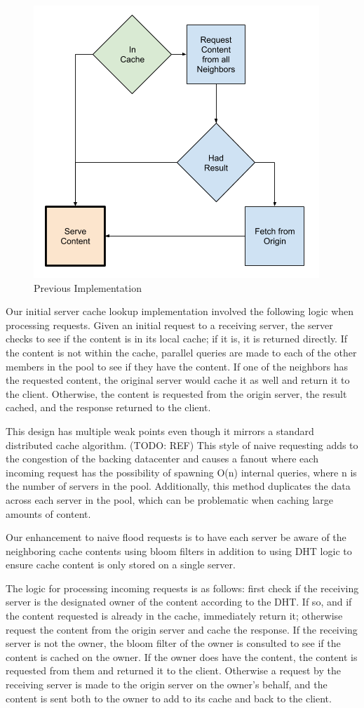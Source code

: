 \documentclass[conference]{IEEEtran}
\begin{document}
\begin{figure}[!h]
		\centering
		\includegraphics[width=0.49\columnwidth]{figures/cache_logic_before.png}
	\caption{Previous Implementation}
\end{figure}

Our initial server cache lookup implementation involved the following logic when processing requests. Given an initial request to a receiving server, the server checks to see if the content is in its local cache; if it is, it is returned directly.  If the content is not within the cache, parallel queries are made to each of the other members in the pool to see if they have the content.  If one of the neighbors has the requested content, the original server would cache it as well and return it to the client. Otherwise, the content is requested from the origin server, the result cached, and the response returned to the client. 

This design has multiple weak points even though it mirrors a standard distributed cache algorithm. (TODO: REF)  This style of naive requesting adds to the congestion of the backing datacenter and causes a fanout where each incoming request has the possibility of spawning O(n) internal queries, where n is the number of servers in the pool.  Additionally, this method duplicates the data across each server in the pool, which can be problematic when caching large amounts of content.

Our enhancement to naive flood requests is to have each server be aware of the neighboring cache contents using bloom filters in addition to using DHT logic to ensure cache content is only stored on a single server.  

The logic for processing incoming requests is as follows: first check if the receiving server is the designated owner of the content according to the DHT.  If so, and if the content requested is already in the cache, immediately return it; otherwise request the content from the origin server and cache the response.  If the receiving server is not the owner, the bloom filter of the owner is consulted to see if the content is cached on the owner.  If the owner does have the content, the content is requested  from them and returned it to the client. Otherwise a request by the receiving server is made to the origin server on the owner’s behalf, and the content is sent both to the owner to add to its cache and back to the client. 
\end{document}
